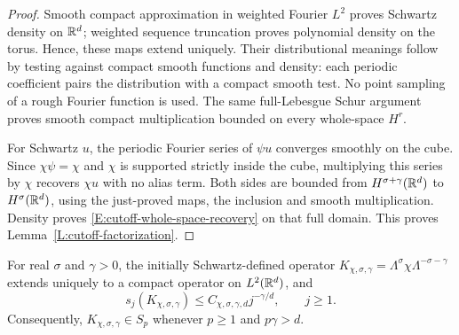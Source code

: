 \begin{proof}
  Smooth compact approximation in weighted Fourier $L^2$ proves Schwartz
  density on $\mathbb{R}^d$; weighted sequence truncation proves polynomial density
  on the torus. Hence, these maps extend uniquely. Their distributional
  meanings follow by testing against compact smooth functions and density:
  each periodic coefficient pairs the distribution with a compact smooth
  test. No point sampling of a rough Fourier function is used. The same
  full-Lebesgue Schur argument proves smooth compact multiplication bounded
  on every whole-space $H^r$.

  For Schwartz $u$, the periodic Fourier series of $\psi u$ converges
  smoothly on the cube. Since $\chi\psi=\chi$ and $\chi$ is supported
  strictly inside the cube, multiplying this series by $\chi$ recovers
  $\chi u$ with no alias term. Both sides are bounded from
  $H^{\sigma+\gamma}(\mathbb{R}^d)$ to $H^\sigma(\mathbb{R}^d)$, using the just-proved
  maps, the inclusion and smooth multiplication. Density proves
  \eqref{E:cutoff-whole-space-recovery} on that full domain.
  This proves Lemma~\ref{L:cutoff-factorization}.
\end{proof}

\begin{proposition}\label{P:cutoff-singular-values}
  For real $\sigma$ and $\gamma > 0$, the initially Schwartz-defined
  operator $K_{\chi,\sigma,\gamma}=\Lambda^\sigma\chi\Lambda^{-\sigma-\gamma}$
  extends uniquely to a compact operator on $L^2(\mathbb{R}^d)$, and
  \begin{equation}\label{E:cutoff-singular-values}
    s_j(K_{\chi,\sigma,\gamma})
    \le C_{\chi,\sigma,\gamma,d}j^{-\gamma/d},\qquad j \ge 1.
  \end{equation}
  Consequently, $K_{\chi,\sigma,\gamma}\in S_p$ whenever $p \ge 1$
  and $p\gamma > d$.
\end{proposition}


